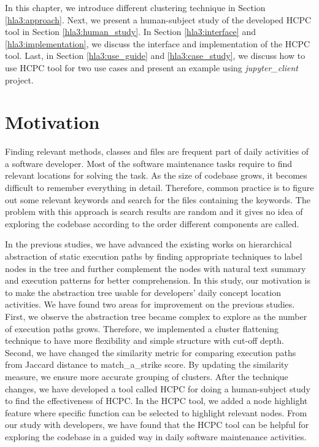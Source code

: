 \label{chapter:hla3}
In this chapter, we introduce different clustering technique in Section \ref{hla3:approach}. Next, we present a  human-subject study of the developed HCPC tool in Section \ref{hla3:human_study}. In Section \ref{hla3:interface} and \ref{hla3:implementation}, we discuss the interface and implementation of the HCPC tool. Last, in Section \ref{hla3:use_guide} and \ref{hla3:case_study}, we discuss how to use HCPC tool for two use cases and present an example using \emph{jupyter\_client} project.

\section{Motivation}
Finding relevant methods, classes and files are frequent part of daily activities of a software developer. Most of the software maintenance tasks require to find relevant locations for solving the task. As the size of codebase grows, it becomes difficult to remember everything in detail. Therefore, common practice is to figure out some relevant keywords and search for the files containing the keywords. The problem with this approach is search results are random and it gives no idea of exploring the codebase according to the order different components are called.

In the previous studies, we have advanced the existing works on hierarchical abstraction of static execution paths by finding appropriate techniques to label nodes in the tree and further complement the nodes with natural text summary and execution patterns for better comprehension. In this study, our motivation is to make the abstraction tree usable for developers' daily concept location activities. We have found two areas for improvement on the previous studies. First, we observe the abstraction tree became complex to explore as the number of execution paths grows. Therefore, we implemented a cluster flattening technique to have more flexibility and simple structure with cut-off depth. Second, we have changed the similarity metric for comparing execution paths from Jaccard distance to match\_a\_strike score. By updating the similarity measure, we ensure more accurate grouping of clusters. After the technique changes, we have developed a tool called HCPC for doing a human-subject study to find the effectiveness of HCPC. In the HCPC tool, we added a node highlight feature where specific function can be selected to highlight relevant nodes. From our study with developers, we have found that the HCPC tool can be helpful for exploring the codebase in a guided way in daily software maintenance activities. 



